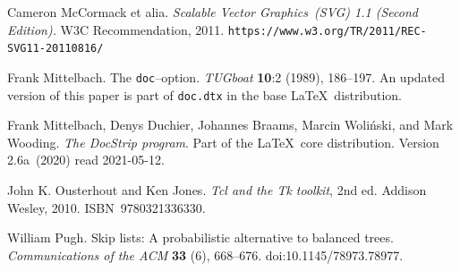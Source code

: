 \documentclass{article}
\theoremstyle{definition}
\providecommand{\url}[1]{\texttt{#1}}
\begin{document}
\begin{thebibliography}{99}
   Cameron McCormack et alia.
   \textit{Scalable Vector Graphics~(SVG) 1.1 (Second Edition).}
   {W3C} Recommendation, 2011.
   \url{https://www.w3.org/TR/2011/REC-SVG11-20110816/}

  Frank Mittelbach.
  The \texttt{doc}--option.
  \textit{TUGboat} \textbf{10}:2 (1989), 186--197.
  An updated version of this paper is part of \texttt{doc.dtx} in the 
  base \LaTeX\ distribution.

  Frank Mittelbach, Denys Duchier, Johannes Braams, 
  Marcin Woli\'{n}ski, and Mark Wooding.
  \textit{The \textsf{DocStrip} program}.
  Part of the \LaTeX\ core distribution. 
  Version 2.6a~(2020) read 2021-05-12.

  John K. Ousterhout and Ken Jones.
  \textit{Tcl and the Tk toolkit}, 2nd ed.
  Addison Wesley, 2010.
  ISBN~9780321336330.

  William Pugh. 
  Skip lists: A probabilistic alternative to balanced trees.
  \textit{Communications of the ACM} \textbf{33} (6), 668--676.
  doi:10.1145/78973.78977.


\end{thebibliography}
\end{document}
